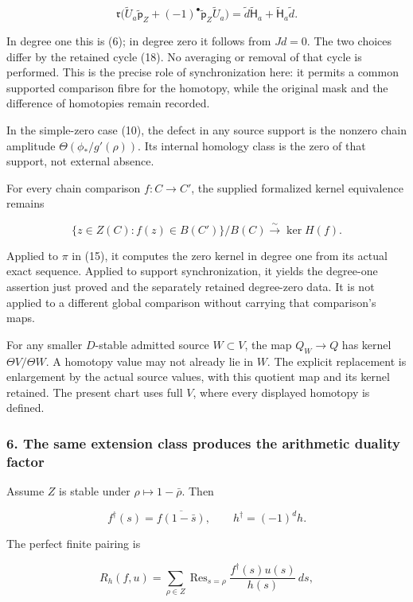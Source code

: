 \[\boxed{\mathfrak r\bigl(\widetilde U_a\widetilde{\mathsf p}_Z
+(-1)^\bullet\widetilde{\mathsf p}_Z\widetilde U_a\bigr)
=\widetilde d\widetilde{\mathsf H}_a+
\widetilde{\mathsf H}_a\widetilde d.}\tag{20}\]

In degree one this is (6); in degree zero it follows from \(Jd=0\). The two choices differ by the
retained cycle (18). No averaging or removal of that cycle is performed. This is the precise role of
synchronization here: it permits a common supported comparison fibre for the homotopy, while the
original mask and the difference of homotopies remain recorded.

In the simple-zero case (10), the defect in any source support is the nonzero chain amplitude
\(\Theta(\phi_*/g'(\rho))\). Its internal homology class is the zero of that support, not external
absence.

For every chain comparison \(f:C\to C'\), the supplied formalized kernel equivalence remains

\[\{z\in Z(C):f(z)\in B(C')\}/B(C)\xrightarrow{\sim}\ker H(f).\]

Applied to \(\pi\) in (15), it computes the zero kernel in degree one from its actual exact
sequence. Applied to support synchronization, it yields the degree-one assertion just proved and the
separately retained degree-zero data. It is not applied to a different global comparison without
carrying that comparison's maps.

For any smaller \(D\)-stable admitted source \(W\subset V\), the map \(Q_W\to Q\) has kernel
\(\Theta V/\Theta W\). A homotopy value may not already lie in \(W\). The explicit replacement is
enlargement by the actual source values, with this quotient map and its kernel retained. The present
chart uses full \(V\), where every displayed homotopy is defined.

\subsubsection{6. The same extension class produces the arithmetic duality
factor}\label{pr_9:the-same-extension-class-produces-the-arithmetic-duality-factor}

Assume \(Z\) is stable under \(\rho\mapsto1-\bar\rho\). Then

\[f^\dagger(s)=\overline{f(1-\bar s)},\qquad h^\dagger=(-1)^d h.\]

The perfect finite pairing is

\[R_h(f,u)=\sum_{\rho\in Z}\operatorname{Res}_{s=\rho}
\frac{f^\dagger(s)u(s)}{h(s)}\,ds,\]

